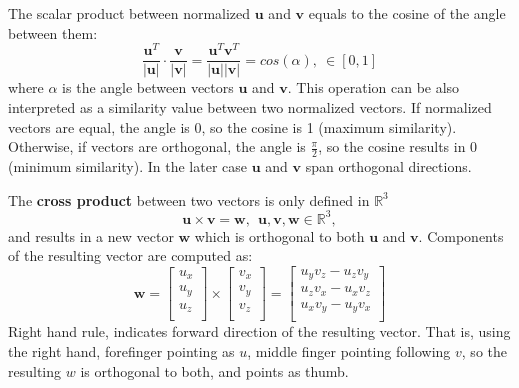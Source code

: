 The scalar product between normalized $\mathbf{u}$ and $\mathbf{v}$ equals to the cosine of the angle between them:
\begin{equation}
 \frac{\mathbf{u}^T}{\vert \mathbf{u} \vert} \cdot \frac{\mathbf{v}}{\vert \mathbf{v} \vert} = 
 \frac{\mathbf{u}^T\mathbf{v}^T}{\vert \mathbf{u} \vert \vert \mathbf{v} \vert} =
 cos (\alpha) , \ \in [0,1]
\end{equation}
where $\alpha$ is the angle between vectors $\mathbf{u}$ and $\mathbf{v}$. This operation can be also interpreted as a similarity value between two normalized vectors. If normalized vectors are equal, the angle is 0, so the cosine is 1 (maximum similarity). Otherwise, if vectors are orthogonal, the angle is $\frac{\pi}{2}$, so the cosine results in 0 (minimum similarity). In the later case $\mathbf{u}$ and $\mathbf{v}$ span orthogonal directions. 

The \textbf{cross product} between two vectors is only defined in $\mathbb{R}^3$
\begin{equation}
 \mathbf{u} \times \mathbf{v} = \mathbf{w} , \ \ \mathbf{u},\mathbf{v},\mathbf{w} \in \mathbb{R}^3, 
\end{equation}
and results in a new vector $\mathbf{w}$ which is orthogonal to both $\mathbf{u}$ and $\mathbf{v}$. Components of the resulting vector are computed as: 
\begin{equation}
\mathbf{w} = 
\left[
\begin{array}{ccc}
  u_x\\
  u_y\\
  u_z\\
\end{array}
\right]
\times
\left[
\begin{array}{ccc}
  v_x\\
  v_y\\
  v_z\\
\end{array}
\right]
 = 
\left[
\begin{array}{ccc}
  u_y v_z - u_z v_y\\
  u_z v_x - u_x v_z\\
  u_x v_y - u_y v_x\\
\end{array}
\right]
 \end{equation}
Right hand rule, indicates forward direction of the resulting vector. That is, using the right hand, forefinger pointing as $u$, middle finger pointing following $v$, so the resulting $w$ is orthogonal to both, and points as thumb. 

